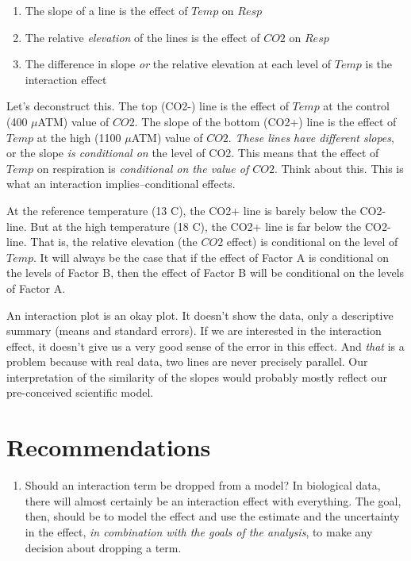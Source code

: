\documentclass[]{book}
\providecommand{\tightlist}{%
  \setlength{\itemsep}{0pt}\setlength{\parskip}{0pt}}
\theoremstyle{definition}
\theoremstyle{definition}
\theoremstyle{definition}
\theoremstyle{remark}
\begin{document}
\begin{enumerate}
\def\labelenumi{\arabic{enumi}.}
\tightlist
\item
  The slope of a line is the effect of \(Temp\) on \(Resp\)
\item
  The relative \emph{elevation} of the lines is the effect of \(CO2\) on
  \(Resp\)
\item
  The difference in slope \emph{or} the relative elevation at each level
  of \(Temp\) is the interaction effect
\end{enumerate}

Let's deconstruct this. The top (CO2-) line is the effect of \(Temp\) at
the control (400 \(\mu\)ATM) value of \(CO2\). The slope of the bottom
(CO2+) line is the effect of \(Temp\) at the high (1100 \(\mu\)ATM)
value of \(CO2\). \emph{These lines have different slopes}, or the slope
\emph{is conditional on} the level of CO2. This means that the effect of
\(Temp\) on respiration is \emph{conditional on the value of \(CO2\)}.
Think about this. This is what an interaction implies--conditional
effects.

At the reference temperature (13 C), the CO2+ line is barely below the
CO2- line. But at the high temperature (18 C), the CO2+ line is far
below the CO2- line. That is, the relative elevation (the \(CO2\)
effect) is conditional on the level of \(Temp\). It will always be the
case that if the effect of Factor A is conditional on the levels of
Factor B, then the effect of Factor B will be conditional on the levels
of Factor A.

An interaction plot is an okay plot. It doesn't show the data, only a
descriptive summary (means and standard errors). If we are interested in
the interaction effect, it doesn't give us a very good sense of the
error in this effect. And \emph{that} is a problem because with real
data, two lines are never precisely parallel. Our interpretation of the
similarity of the slopes would probably mostly reflect our pre-conceived
scientific model.

\section{Recommendations}\label{recommendations-1}

\begin{enumerate}
\def\labelenumi{\arabic{enumi}.}
\tightlist
\item
  Should an interaction term be dropped from a model? In biological
  data, there will almost certainly be an interaction effect with
  everything. The goal, then, should be to model the effect and use the
  estimate and the uncertainty in the effect, \emph{in combination with
  the goals of the analysis}, to make any decision about dropping a
  term.
\end{enumerate}
\end{document}

